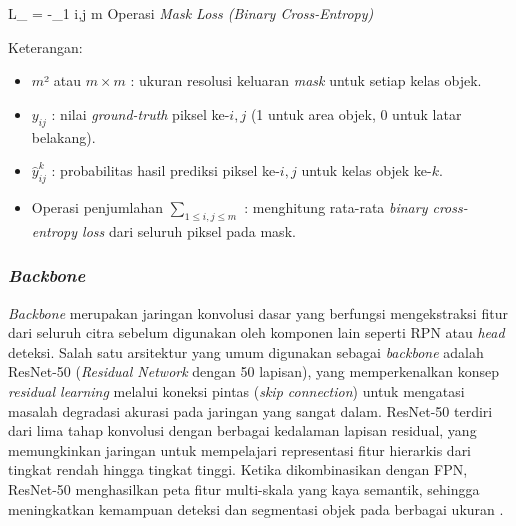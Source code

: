 \vspace{0.5\baselineskip}
\begin{equationcaptioned}[eq:2.maskloss]{
	L_{} = -\sum_{1 \leq i,j \leq m}
}{
	Operasi \textit{Mask Loss (Binary Cross-Entropy)}
}
\end{equationcaptioned}

Keterangan:
\begin{itemize}
\renewcommand\labelitemi{}
	\item $m$² atau $m \times m$ : ukuran resolusi keluaran \textit{mask} untuk setiap kelas objek.
	\item $y_{ij}$ : nilai \textit{ground-truth} piksel ke-$i,j$ (1 untuk area objek, 0 untuk latar belakang).
	\item $\hat{y}^{k}_{ij}$ : probabilitas hasil prediksi piksel ke-$i,j$ untuk kelas objek ke-$k$.
	\item Operasi penjumlahan $\sum_{1 \leq i,j \leq m}$ : menghitung rata-rata \textit{binary cross-entropy loss} dari seluruh piksel pada mask.
\end{itemize}

\subsubsection{\textit{Backbone}} \label{II.TeoriBackbone}
\textit{Backbone} merupakan jaringan konvolusi dasar yang berfungsi mengekstraksi fitur dari seluruh citra sebelum digunakan oleh komponen lain seperti RPN atau \textit{head} deteksi. Salah satu arsitektur yang umum digunakan sebagai \textit{backbone} adalah ResNet-50 (\textit{Residual Network} dengan 50 lapisan), yang memperkenalkan konsep \textit{residual learning} melalui koneksi pintas (\textit{skip connection}) untuk mengatasi masalah degradasi akurasi pada jaringan yang sangat dalam. ResNet-50 terdiri dari lima tahap konvolusi dengan berbagai kedalaman lapisan residual, yang memungkinkan jaringan untuk mempelajari representasi fitur hierarkis dari tingkat rendah hingga tingkat tinggi. Ketika dikombinasikan dengan FPN, ResNet-50 menghasilkan peta fitur multi-skala yang kaya semantik, sehingga meningkatkan kemampuan deteksi dan segmentasi objek pada berbagai ukuran \cite{DeepResidual}. \par

